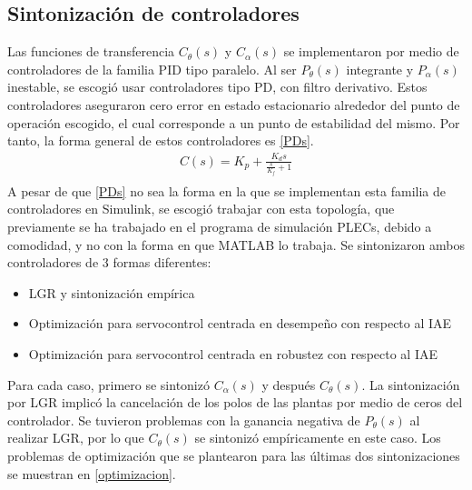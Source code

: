 \subsection{Sintonización de controladores}
Las funciones de transferencia $C_{\theta}(s)$ y $C_{\alpha}(s)$ se implementaron por medio de controladores
de la familia PID tipo paralelo.
Al ser $P_{\theta}(s)$ integrante y $P_{\alpha}(s)$ inestable, se escogió usar controladores tipo PD, con filtro derivativo.
Estos controladores aseguraron cero error en estado estacionario alrededor del punto de operación escogido, el cual
corresponde a un punto de estabilidad del mismo.
Por tanto, la forma general de estos controladores es \eqref{PDs}.
\begin{equation}
    \begin{aligned}
        C(s) = K_p + \frac{K_ds}{ \frac{s}{K_f} + 1}\label{PDs}\\
    \end{aligned}
\end{equation}
A pesar de que \eqref{PDs} no sea la forma en la que se implementan esta familia de controladores en Simulink,
se escogió trabajar con esta topología, que previamente se ha trabajado en el programa de simulación PLECs, debido 
a comodidad, y no con la forma en que MATLAB lo trabaja.
Se sintonizaron ambos controladores de 3 formas diferentes:
\begin{itemize}
    \item LGR y sintonización empírica
    \item Optimización para servocontrol centrada en desempeño con respecto al IAE
    \item Optimización para servocontrol centrada en robustez con respecto al IAE
\end{itemize}
Para cada caso, primero se sintonizó $C_{\alpha}(s)$ y después $C_{\theta}(s)$.
La sintonización por LGR implicó la cancelación de los polos de las plantas por medio
de ceros del controlador.
Se tuvieron problemas con la ganancia negativa de $P_{\theta}(s)$ al realizar LGR, por lo que 
$C_{\theta}(s)$ se sintonizó empíricamente en este caso.
Los problemas de optimización que se plantearon para las últimas dos sintonizaciones se muestran
en \eqref{optimizacion}.

